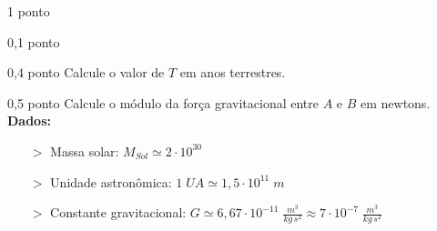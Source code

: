 \documentclass{../lista}
\begin{document}
\begin{questao}{1 ponto}
\begin{pergunta}{0,1 ponto}
		\end{pergunta}

		\begin{pergunta}{0,4 ponto}
			Calcule o valor de $T$ em anos terrestres.
			

		\end{pergunta}

		\begin{pergunta}{0,5 ponto}
			Calcule o módulo da força gravitacional entre $A$ e $B$ em newtons. \\
			\textbf{Dados:}
				\begin{itemize}
					\item[$>$] Massa solar: $M_{Sol} \simeq 2 \cdot 10^{30}$
					\item[$>$] Unidade astronômica: $1 \; UA \simeq 1,5 \cdot 10^{11} \; m$
					\item[$>$] Constante gravitacional: $G \simeq 6,67 \cdot 10^{-11} \; \frac{m^3}{kg \, s^2} \approx 7 \cdot 10^{-7} \; \frac{m^3}{kg \, s^2}$
				\end{itemize}
			

		\end{pergunta}
	\end{questao}
	
	\encerramento
\end{document}
